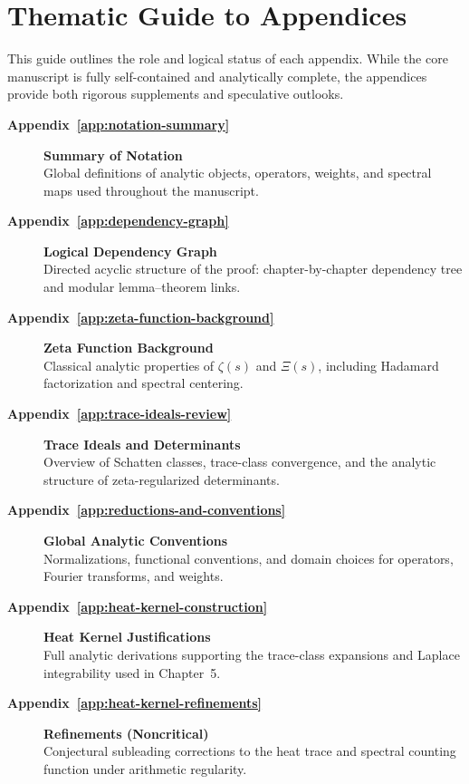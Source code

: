 \section*{Thematic Guide to Appendices}

This guide outlines the role and logical status of each appendix. While the core manuscript is fully self-contained and analytically complete, the appendices provide both rigorous supplements and speculative outlooks.

\begin{description}
  \item[\textbf{Appendix~\ref{app:notation-summary}}] \textbf{Summary of Notation} \\
  Global definitions of analytic objects, operators, weights, and spectral maps used throughout the manuscript.

  \item[\textbf{Appendix~\ref{app:dependency-graph}}] \textbf{Logical Dependency Graph} \\
  Directed acyclic structure of the proof: chapter-by-chapter dependency tree and modular lemma–theorem links.

  \item[\textbf{Appendix~\ref{app:zeta-function-background}}] \textbf{Zeta Function Background} \\
  Classical analytic properties of \( \zeta(s) \) and \( \Xi(s) \), including Hadamard factorization and spectral centering.

  \item[\textbf{Appendix~\ref{app:trace-ideals-review}}] \textbf{Trace Ideals and Determinants} \\
  Overview of Schatten classes, trace-class convergence, and the analytic structure of zeta-regularized determinants.

  \item[\textbf{Appendix~\ref{app:reductions-and-conventions}}] \textbf{Global Analytic Conventions} \\
  Normalizations, functional conventions, and domain choices for operators, Fourier transforms, and weights.

  \item[\textbf{Appendix~\ref{app:heat-kernel-construction}}] \textbf{Heat Kernel Justifications} \\
  Full analytic derivations supporting the trace-class expansions and Laplace integrability used in Chapter~5.

  \item[\textbf{Appendix~\ref{app:heat-kernel-refinements}}] \textbf{Refinements (Noncritical)} \\
  Conjectural subleading corrections to the heat trace and spectral counting function under arithmetic regularity.


\end{description}
